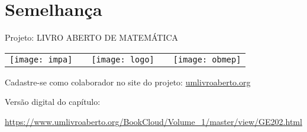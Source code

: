 
\ifnum{}
\renewcommand\chapterillustration{abertura-semelhanca}
\else
\renewcommand\chapterillustration{abertura-semelhanca-professor}
\fi
\renewcommand\chapterwhat{São estudadas a semelhança de figuras geométricas, os casos de semelhança de triângulos e polígonos, e suas aplicações.}

\renewcommand\chapterbecause{Em primeiro lugar, o conceito de semelhança está presente em diversos contextos e sua compreensão permite compreender melhor o mundo que vivemos. Por outro lado, a semelhança de triângulos é um instrumento importante para obter propriedades métricas e relações entre elementos de polígonos. Por fim, a semelhança de triângulos é uma ferramenta muito útil na resolução de problemas de geometria, tanto plana quanto no espaço.}

\chapter{Semelhança}

\mbox{}\thispagestyle{empty}\clearpage

\thispagestyle{empty}

\begin{center}
Projeto: LIVRO ABERTO DE MATEMÁTICA

\noindent \begin{tabular}{lcccr}
\texttt{[image: impa]}& \quad\quad& \texttt{[image: logo]} & \quad\quad& \texttt{[image: obmep]} 
\end{tabular}
\end{center}

\vspace*{.3cm}

Cadastre-se como colaborador no site do projeto: \url{umlivroaberto.org}

Versão digital do capítulo:

\url{https://www.umlivroaberto.org/BookCloud/Volume_1/master/view/GE202.html}


